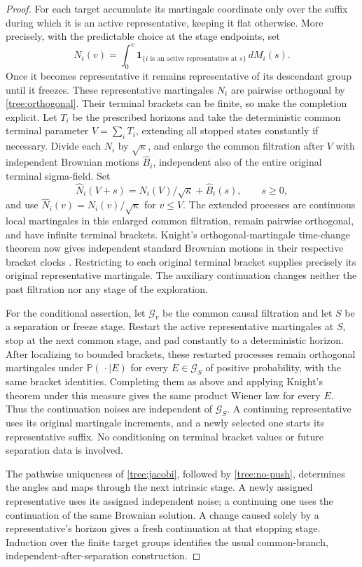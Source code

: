 \begin{proof}
For each target accumulate its martingale coordinate only over the
suffix during which it is an active representative, keeping it flat
otherwise.  More precisely, with the predictable choice at the stage
endpoints, set
\[
 N_i(v)=\int_0^v
 \mathbf 1_{\{i\text{ is an active representative at }s\}}\,dM_i(s).
\]
Once it becomes representative it remains representative of its
descendant group until it freezes.  These representative martingales
$N_i$ are pairwise orthogonal by \eqref{tree:orthogonal}.
Their terminal brackets can be finite, so make the completion explicit.
Let $T_i$ be the prescribed horizons and take the deterministic common
terminal parameter $V=\sum_iT_i$, extending all stopped states constantly
if necessary.  Divide each $N_i$ by $\sqrt\kappa$, and enlarge the
common filtration after $V$ with
independent Brownian motions $\widehat B_i$, independent also of the
entire original terminal sigma-field.  Set
\[
 \widehat N_i(V+s)=N_i(V)/\sqrt\kappa+\widehat B_i(s),\qquad s\ge0,
\]
and use $\widehat N_i(v)=N_i(v)/\sqrt\kappa$ for $v\le V$.
The extended processes are continuous local martingales in this
enlarged common filtration, remain pairwise orthogonal, and have
infinite terminal brackets.  Knight's orthogonal-martingale time-change
theorem now gives independent standard Brownian motions in their
respective bracket clocks
\citep[Theorem~2, p.~191]{Meyer1971Knight}.
Restricting to each original terminal bracket supplies precisely its
original representative martingale.  The auxiliary continuation changes
neither the past filtration nor any stage of the exploration.

For the conditional assertion, let $\mathcal G_v$ be the common causal
filtration and let $S$ be a separation or freeze stage.  Restart the
active representative martingales at $S$, stop at the next common stage,
and pad constantly to a deterministic horizon.  After localizing to
bounded brackets, these restarted processes remain orthogonal
martingales under $\mathbb P(\,\cdot\mid E)$ for every $E\in\mathcal G_S$ of
positive probability, with the same bracket identities.  Completing
them as above and applying Knight's theorem under this measure gives
the same product Wiener law for every $E$.  Thus the continuation
noises are independent of $\mathcal G_S$.  A continuing representative
uses its original martingale increments, and a newly selected one
starts its representative suffix.  No conditioning on terminal
bracket values or future separation data is involved.

The pathwise uniqueness of \eqref{tree:jacobi}, followed by
\eqref{tree:no-push}, determines the angles and maps through the next
intrinsic stage.  A newly assigned representative uses its assigned
independent noise; a continuing one uses the continuation of the same
Brownian solution.  A change caused solely by a representative's
horizon gives a fresh continuation at that stopping stage.  Induction
over the finite target groups identifies the usual common-branch,
independent-after-separation construction.


\end{proof}
